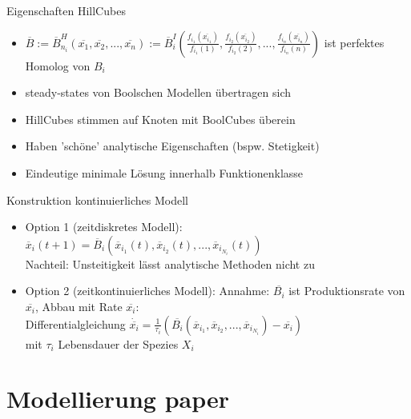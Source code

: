 \documentclass[handout]{beamer}
\begin{document}
\begin{frame}{Eigenschaften HillCubes}
\begin{itemize}
	\item  $\overline{B} := \overline{B}^{H}_{n_{i}}(\overline{x_{1}}, \overline{x_{2}},...,\overline{x_{n}}) := \overline{B}^{I}_{i}(\frac{f_{i_{1}}(\overline{x_{i_{1}}})}{f_{i_{1}}(1)},\frac{f_{i_{2}}(\overline{x_{i_{2}}})}{f_{i_{2}}(2)},...,\frac{f_{i_{n}}(\overline{x_{i_{n}}})}{f_{i_{n}}(n)})$ ist perfektes Homolog von $B_{i}$
	\pause
	\item steady-states von Boolschen Modellen \"ubertragen sich
	\pause
	\item HillCubes stimmen auf Knoten mit BoolCubes \"uberein
	\pause
	\item Haben 'sch\"one' analytische Eigenschaften (bspw. Stetigkeit)
	\pause
	\item Eindeutige minimale L\"osung innerhalb Funktionenklasse
\end{itemize}
\end{frame}

\begin{frame}{Konstruktion kontinuierliches Modell}
\begin{itemize}
	\item Option 1 (zeitdiskretes Modell): $\overline{x}_{i}(t+1) = \overline{B}_{i}(\overline{x}_{i_{1}}(t),\overline{x}_{i_{2}}(t),...,\overline{x}_{i_{N_{i}}}(t))$
	\pause
	\\ Nachteil: Unsteitigkeit l\"asst analytische Methoden nicht zu
	\pause
	\item Option 2 (zeitkontinuierliches Modell): Annahme: $\overline{B_{i}}$ ist Produktionsrate von $\overline{x_{i}}$, Abbau mit Rate $\overline{x_{i}}$:
	\pause
	\\ Differentialgleichung $\dot{\overline{x_{i}}} = \frac{1}{\tau_{i}} (\overline{B_{i}}(\overline{x}_{i_{1}},\overline{x}_{i_{2}},...,\overline{x}_{i_{N_{i}}}) - \overline{x_{i}})$
	\\ mit $\tau_{i}$ Lebensdauer der Spezies $X_{i}$
\end{itemize}
\end{frame}

\section{Modellierung paper}
\end{document}

